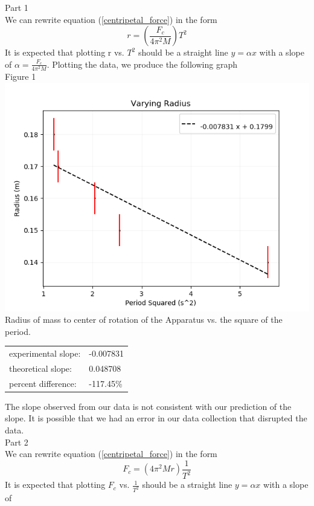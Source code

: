 \documentclass[12pt]{report}
\begin{document}
\begin{flushleft}
\begin{multicols}{2}
\large Part 1 \\ \normalsize
We can rewrite equation (\ref{centripetal_force}) in the form
\begin{equation}
r = (\frac{F_c}{4\pi^2M})T^2
\end{equation}
It is expected that plotting r vs. $T^2$ should be a straight line $y = \alpha x$ with a slope of
$\alpha = \frac{F_c}{4\pi^2M}$. Plotting the data, we produce the following graph \\
\small Figure 1 \\
\includegraphics[scale=0.45]{VaryingRadius}
\center Radius of mass to center of rotation of the Apparatus vs. the square of the period.\\
\begin{tabular}{ll}
experimental slope: & -0.007831 \\
theoretical slope: & 0.048708 \\
percent difference: & -117.45\%
\end{tabular}
\flushleft The slope observed from our data is not consistent with our
prediction of the slope. It is possible that we had an error in our data collection
that disrupted the data. \\
\vspace{10px}
\large Part 2 \\ \normalsize
We can rewrite equation (\ref{centripetal_force}) in the form
\begin{equation} \label{centripetal_force2}
F_c = (4\pi^2Mr)\frac{1}{T^2}
\end{equation}
It is expected that plotting $F_c$ vs. $\frac{1}{T^2}$ should be a straight line $y = \alpha x$ with a slope of

\end{multicols}
\end{flushleft}
\end{document}
